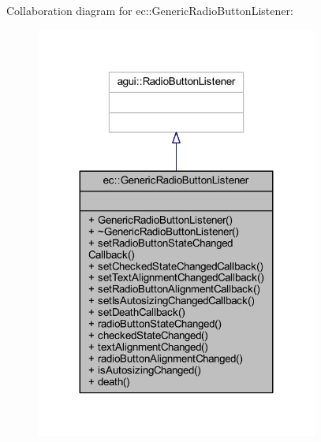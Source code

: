 Collaboration diagram for ec\+:\+:Generic\+Radio\+Button\+Listener\+:\nopagebreak
\begin{figure}[H]
\begin{center}
\leavevmode
\includegraphics[width=263pt]{classec_1_1_generic_radio_button_listener__coll__graph}
\end{center}
\end{figure}
